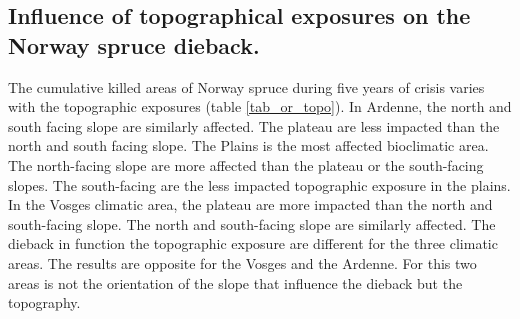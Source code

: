 \documentclass[3p,procedia]{elsarticle}
\begin{document}


	


\subsection{Influence of topographical exposures on the Norway spruce dieback.}

The cumulative killed areas of Norway spruce during five years of crisis varies with the topographic exposures (table \ref{tab_or_topo}).
In Ardenne, the north and south facing slope are similarly affected. 
The plateau are less impacted than the north and south facing slope.
The Plains is the most affected bioclimatic area. 
The north-facing slope are more affected than the plateau or the south-facing slopes.
The south-facing are the less impacted topographic exposure in the plains.
In the Vosges climatic area, the plateau are more impacted than the north and south-facing slope.
The north and south-facing slope are similarly affected.
The dieback in function the topographic exposure are different for the three climatic areas.
The results are opposite for the Vosges and the Ardenne.
For this two areas is not the orientation of the slope that influence the dieback but the topography.
\end{document}
